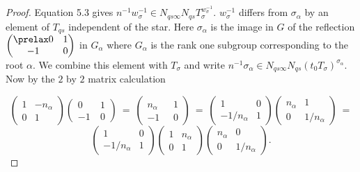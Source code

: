 \documentclass{memo-l}
\theoremstyle{definition}
\theoremstyle{remark}
\numberwithin{section}{chapter}
\numberwithin{equation}{chapter}
\begin{document}
\begin{proof}     Equation 5.3 gives $n^{-1}w_{{\sigma}}^{-1} \in
N_{qs{\infty}}N_{qs}T_{{\sigma}}^{w_\sigma^{-1}}$.
$w_{{\sigma}}^{-1}$ differs from ${\sigma}_{{\alpha}}$ by an element of
$T_{qs}$ independent of the star.
 Here ${\sigma}_{{\alpha}}$ is the image in $G$ of the reflection
$
\begin{pmatrix} \prelax  
0 & 1 \\ -1 & 0 \end{pmatrix}
$
in $G_{{\alpha}}$ where $G_{{\alpha}}$ is the rank one subgroup corresponding
to the root ${\alpha}$.
 We combine this element with $T_{{\sigma}}$ and write
$n^{-1}{\sigma}_{{\alpha}} \in
N_{qs{\infty}}N_{qs}(t_{0}T_{{\sigma}})^{\sigma_\alpha}.$  Now by the $2$ by $2$ matrix calculation

{\bigskip}

$$
{\begin{pmatrix} 
1 & -n_\alpha \\ 0 & 1 \end{pmatrix}}
{\begin{pmatrix} 
0\  & 1 \\ -1\  & 0 \end{pmatrix}}\ =\
{\begin{pmatrix} 
n_\alpha & 1 \\ -1{\phantom{n}} & 0 \end{pmatrix}}\ =\
{\begin{pmatrix} 
1 & 0 \\ -1/n_\alpha & 1 \end{pmatrix}}
{\begin{pmatrix} 
n_\alpha & 1 \\ 0 & 1/n_\alpha \end{pmatrix}}\ =
$$
$$
{\begin{pmatrix} 
1 & 0 \\ -1/n_\alpha & 1 \end{pmatrix}}
{\begin{pmatrix} 
1 & n_\alpha \\ 0 & 1 \end{pmatrix}}
{\begin{pmatrix} 
 n_\alpha & 0 \\ 0 & 1/n_\alpha \end{pmatrix}}.
$$


\end{proof}
\end{document}
